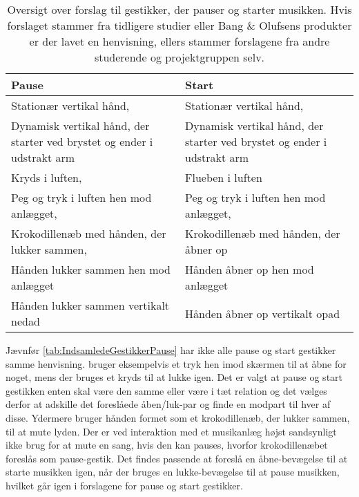 \begin{table}[H]
	\centering
	\begin{tabular}{| p{6cm} | p{6cm} | }
		\hline
		\textbf{Pause} & \textbf{Start} \\ \hline
		Stationær vertikal hånd, \parencite[s. 166]{PDF:ComparingInputModalities} & Stationær vertikal hånd, \parencite[s. 166]{PDF:ComparingInputModalities} \\ \hline
		Dynamisk vertikal hånd, der starter ved brystet og ender i udstrakt arm  & Dynamisk vertikal hånd, der starter ved brystet og ender i udstrakt arm  \\ \hline
		Kryds i luften, \parencite[s. 48]{PDF:UserDefinedGesturesTV} & Flueben i luften \\ \hline
		Peg og tryk i luften hen mod anlægget, \parencite{WEB:BeosoundMoment, WEB:Beosound2} & Peg og tryk i luften hen mod anlægget, \parencite[s. 48]{WEB:BeosoundMoment, WEB:Beosound2, PDF:UserDefinedGesturesTV} \\ \hline
		Krokodillenæb med hånden, der lukker sammen, \parencite[s. 48]{PDF:UserDefinedGesturesTV} & Krokodillenæb med hånden, der åbner op \\ \hline
		Hånden lukker sammen hen mod anlægget & Hånden åbner op hen mod anlægget \\ \hline
		Hånden lukker sammen vertikalt nedad & Hånden åbner op vertikalt opad  \\ \hline
	\end{tabular}
	\caption{Oversigt over forslag til gestikker, der pauser og starter musikken. Hvis forslaget stammer fra tidligere studier eller Bang $\&$ Olufsens produkter er der lavet en henvisning, ellers stammer forslagene fra andre studerende og projektgruppen selv.}
	\label{tab:IndsamledeGestikkerPause}
\end{table}
\noindent
%
Jævnfør \autoref{tab:IndsamledeGestikkerPause} har ikke alle pause og start gestikker samme henvisning. \textcite[s. 48]{PDF:UserDefinedGesturesTV} bruger eksempelvis et tryk hen imod skærmen til at åbne for noget, mens der bruges et kryds til at lukke igen. Det er valgt at pause og start gestikken enten skal være den samme eller være i tæt relation og det vælges derfor at adskille det foreslåede åben/luk-par og finde en modpart til hver af disse. Ydermere bruger \textcite[s. 48]{PDF:UserDefinedGesturesTV} hånden formet som et krokodillenæb, der lukker sammen, til at mute lyden. Der er ved interaktion med et musikanlæg højst sandsynligt ikke brug for at mute en sang, hvis den kan pauses, hvorfor krokodillenæbet foreslås som pause-gestik. Det findes passende at foreslå en åbne-bevægelse til at starte musikken igen, når der bruges en lukke-bevægelse til at pause musikken, hvilket går igen i forslagene for pause og start gestikker.
